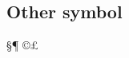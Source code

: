 \documentclass{article}
\begin{document}
        \subsection{Other symbol}
            \S \quad \dag \quad \ddag \quad \P\newline
            \copyright \quad \textregistered \quad \texttrademark \quad \pounds \quad \textbullet\newline
            \texteuro \quad \textperthousand\newline
             \quad {} \quad {} \quad {}
\end{document}
